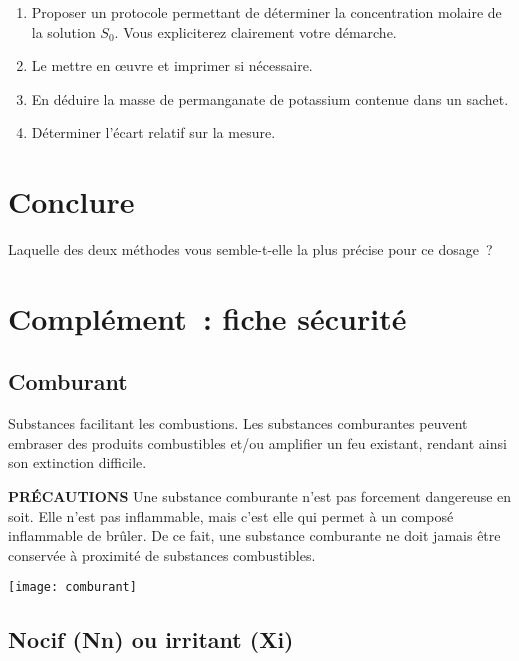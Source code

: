 \documentclass[a4paper, 11pt, final, garamond]{book}
\begin{document}
\begin{enumerate}
    \item Proposer un protocole permettant de déterminer la concentration
        molaire de la solution $S_0$. Vous expliciterez clairement votre
        démarche.
    \item Le mettre en œuvre et imprimer si nécessaire.
    \item En déduire la masse de permanganate de potassium contenue dans un
        sachet.
    \item Déterminer l'écart relatif sur la mesure.
\end{enumerate}

\section{Conclure}

Laquelle des deux méthodes vous semble-t-elle la plus précise pour ce dosage~?

\section{Complément~: fiche sécurité}

\subsection{Comburant}

\begin{minipage}{0.77\linewidth}
    Substances facilitant les combustions. Les substances comburantes peuvent
    embraser des produits combustibles et/ou amplifier un feu existant, rendant
    ainsi son extinction difficile.\bigbreak

    \textbf{PRÉCAUTIONS}
    Une substance comburante n'est pas forcement dangereuse en soit. Elle n'est
    pas inflammable, mais c'est elle qui permet à un composé inflammable de
    brûler. De ce fait, une substance comburante ne doit jamais être conservée à
    proximité de substances combustibles.
\end{minipage}
\begin{minipage}{0.23\linewidth}
    \begin{center}
        \texttt{[image: comburant]}
    \end{center}
\end{minipage}

\subsection{Nocif (Nn) ou irritant (Xi)}
\end{document}
